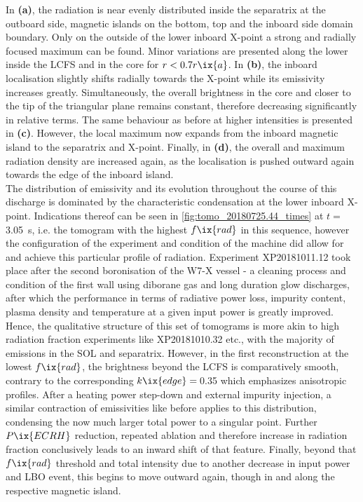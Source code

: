 %
            In \textbf{(a)}, the radiation is near evenly distributed inside the separatrix at the outboard side, magnetic islands on the bottom, top and the inboard side domain boundary. Only on the outside of the lower inboard X-point a strong and radially focused maximum can be found. Minor variations are presented along the lower inside the LCFS and in the core for $r<0.7r\ix{a}$. In \textbf{(b)}, the inboard localisation slightly shifts radially towards the X-point while its emissivity increases greatly. Simultaneously, the overall brightness in the core and closer to the tip of the triangular plane remains constant, therefore decreasing significantly in relative terms. The same behaviour as before at higher intensities is presented in \textbf{(c)}. However, the local maximum now expands from the inboard magnetic island to the separatrix and X-point. Finally, in \textbf{(d)}, the overall and maximum radiation density are increased again, as the localisation is pushed outward again towards the edge of the inboard island.\\%
            The distribution of emissivity and its evolution throughout the course of this discharge is dominated by the characteristic condensation at the lower inboard X-point. Indications thereof can be seen in \cref{fig:tomo_20180725.44_times} at $t=$\SI{3.05}{\second}, i.e. the tomogram with the highest $f\ix{rad}$ in this sequence, however the configuration of the experiment and condition of the machine did allow for and achieve this particular profile of radiation. Experiment XP20181011.12 took place after the second boronisation of the W7-X vessel - a cleaning process and condition of the first wall using diborane gas and long duration glow discharges, after which the performance in terms of radiative power loss, impurity content, plasma density and temperature at a given input power is greatly improved. Hence, the qualitative structure of this set of tomograms is more akin to high radiation fraction experiments like XP20181010.32 etc., with the majority of emissions in the SOL and separatrix. However, in the first reconstruction at the lowest $f\ix{rad}$, the brightness beyond the LCFS is comparatively smooth, contrary to the corresponding $k\ix{edge}=\,$\SI{0.35}{\arbitraryunit} which emphasizes anisotropic profiles. After a heating power step-down and external impurity injection, a similar contraction of emissivities like before applies to this distribution, condensing the now much larger total power to a singular point. Further $P\ix{ECRH}$ reduction, repeated ablation and therefore increase in radiation fraction conclusively leads to an inward shift of that feature. Finally, beyond that $f\ix{rad}$ threshold and total intensity due to another decrease in input power and LBO event, this begins to move outward again, though in and along the respective magnetic island.\\%
